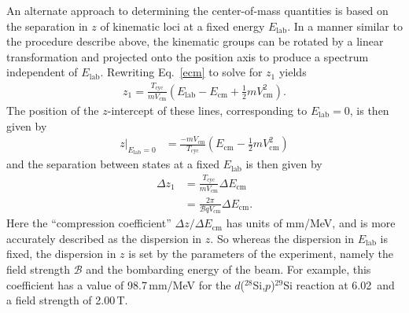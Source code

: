An alternate approach to determining the center-of-mass quantities is based on the separation in $z$ of kinematic loci at a fixed energy $E_\mathrm{lab}$.  In a manner similar to the procedure describe above, the kinematic groups can be rotated by a linear transformation and projected onto the position axis to produce a spectrum independent of $E_\mathrm{lab}$.  Rewriting Eq.~\ref{ecm} to solve for $z_1$ yields
\begin{equation}
\begin{split}
z_1=\frac{T_\mathrm{cyc}}{m V_\mathrm{cm}}\left(E_\mathrm{lab}-E_\mathrm{cm}+\frac{1}{2}m V_\mathrm{cm}^2\right).
\end{split}
\label{eq:z_new}
\end{equation}
The position of the $z$-intercept of these lines, corresponding to $E_\mathrm{lab}=0$, is then given by 
\begin{equation}
\begin{split}
z\big|_{E_\mathrm{lab}=0}&=\frac{-mV_\mathrm{cm}}{T_\mathrm{cyc}}\left(E_\mathrm{cm}-\frac{1}{2}m V_\mathrm{cm}^2\right)
\end{split}
\label{x_intercept}
\end{equation}
and the separation between states at a fixed $E_\mathrm{lab}$ is then given by 
\begin{equation}
\begin{split}
\Delta z_1&=\frac{T_\mathrm{cyc}}{m V_\mathrm{cm}}\Delta E_\mathrm{cm}\\
        &=\frac{2 \pi}{\mathscr{B}q V_\mathrm{cm}}\Delta E_\mathrm{cm}.
\end{split}
\label{eq:delta_z}
\end{equation}
Here the ``compression coefficient'' $\Delta z/\Delta E_\mathrm{cm}$ has units of mm/MeV, and is more accurately described as the dispersion in $z$.  So whereas the dispersion in $E_\mathrm{lab}$ is fixed, the dispersion in $z$ is set by the parameters of the experiment, namely the field strength $\mathscr{B}$ and the bombarding energy of the beam.    For example, this coefficient has a value of 98.7\,mm/MeV for the $d$($^{28}$Si,$p$)$^{29}$Si reaction at 6.02\,\AMeV{} and a field strength of 2.00\,T.

